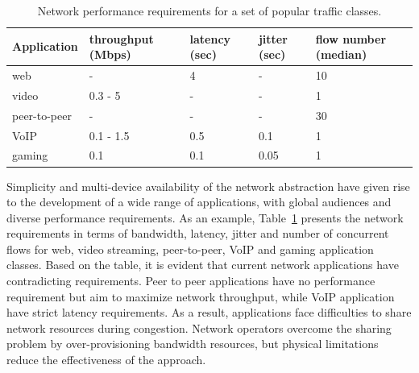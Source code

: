 \begin{table} 
  \centering 
    \begin{tabular}{| p{5cm} | p{2cm} p{2cm} p{2cm} p{2.5cm} |} 
      \hline
      Application                              & throughput (Mbps) & latency (sec) & jitter (sec)  & flow number (median) \\ \hline
      web~\cite{Akamai_4_seconds,Butkiewicz11} & -                 & 4            & -              & 10               \\
      video~\cite{Finamore11}                  & 0.3 - 5           & -            & -              & 1                \\
      peer-to-peer~\cite{Rasti07,pouwelse2004} & -                 & -            & -              & 30               \\ 
      VoIP                                     & 0.1 - 1.5         & 0.5          & 0.1            & 1                 \\ 
      gaming~\cite{armitage2006networking}     & 0.1               & 0.1          & 0.05           & 1                 \\
      \hline 
    \end{tabular} 
  \caption{Network performance requirements for a set of popular traffic classes.} \label{tbl:application_requirement} 
\end{table}

Simplicity and  multi-device availability  of the network abstraction have given
rise to the development of a wide range of applications, with global audiences
and diverse performance requirements.  As an example,
Table~\ref{tbl:application_requirement} presents the network requirements in
terms of bandwidth, latency, jitter and number of concurrent flows for web, video
streaming, peer-to-peer,  VoIP and gaming application classes.  Based on the
table, it is evident that current network applications have contradicting
requirements. Peer to peer applications have no performance requirement but aim
to maximize network throughput, while VoIP application have strict latency
requirements.  As a result, applications face difficulties to share network
resources during congestion.  Network operators overcome the sharing problem by
over-provisioning bandwidth resources, but physical limitations reduce the
effectiveness of the approach. 

